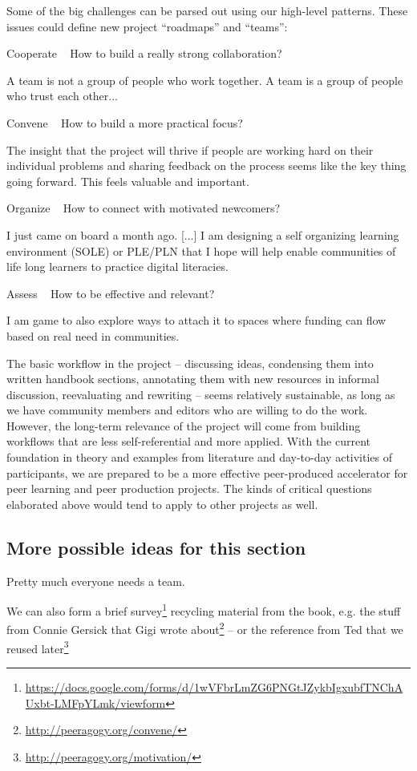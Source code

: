 \documentclass{acm_proc_article-sp}
\begin{document}
Some of the big challenges can be parsed out using our high-level patterns. These issues could define new project ``roadmaps'' and ``teams'':

    Cooperate ~ How to build a really strong collaboration?

        A team is not a group of people who work together. A team is a group of people who trust each other...

    Convene ~ How to build a more practical focus?

        The insight that the project will thrive if people are working hard on their individual problems and sharing feedback on the process seems like the key thing going forward. This feels valuable and important.

    Organize ~ How to connect with motivated newcomers?

        I just came on board a month ago. [...] I am designing a self organizing learning environment (SOLE) or PLE/PLN that I hope will help enable communities of life long learners to practice digital literacies.

    Assess ~ How to be effective and relevant?

        I am game to also explore ways to attach it to spaces where funding can flow based on real need in communities.

The basic workflow in the project -- discussing ideas, condensing them into written handbook sections, annotating them with new resources in informal discussion, reevaluating and rewriting -- seems relatively sustainable, as long as we have community members and editors who are willing to do the work. However, the long-term relevance of the project will come from building workflows that are less self-referential and more applied. With the current foundation in theory and examples from literature and day-to-day activities of participants, we are prepared to be a more effective peer-produced accelerator for peer learning and peer production projects. The kinds of critical questions elaborated above would tend to apply to other projects as well.

\subsection{More possible ideas for this section}

Pretty much everyone needs a team.

We can also form a brief survey\footnote{\url{https://docs.google.com/forms/d/1wVFbrLmZG6PNGtJZykbIgxubfTNChAUxbt-LMFpYLmk/viewform}} recycling material from the book, e.g. the stuff from Connie Gersick that Gigi wrote about\footnote{\url{http://peeragogy.org/convene/}} -- or the reference from Ted that we reused later\footnote{\url{http://peeragogy.org/motivation/}}
\end{document}
